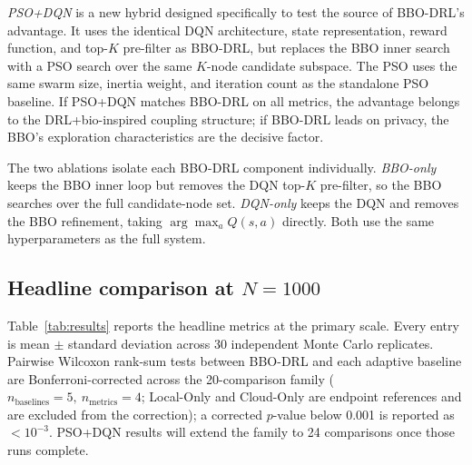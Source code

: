 \documentclass[journal]{IEEEtran}
\begin{document}
\textit{PSO+DQN} is a new hybrid designed specifically to test the
source of BBO-DRL's advantage. It uses the identical DQN architecture,
state representation, reward function, and top-$K$ pre-filter as
BBO-DRL, but replaces the BBO inner search with a PSO search over the
same $K$-node candidate subspace. The PSO uses the same swarm size,
inertia weight, and iteration count as the standalone PSO baseline.
If PSO+DQN matches BBO-DRL on all metrics, the advantage belongs to
the DRL+bio-inspired coupling structure; if BBO-DRL leads on privacy,
the BBO's exploration characteristics are the decisive factor.

The two ablations isolate each BBO-DRL component individually.
\textit{BBO-only} keeps the BBO inner loop but removes the DQN
top-$K$ pre-filter, so the BBO searches over the full candidate-node
set. \textit{DQN-only} keeps the DQN and removes the BBO refinement,
taking $\arg\max_a Q(s,a)$ directly. Both use the same hyperparameters
as the full system.

\subsection{Headline comparison at $N = 1000$}
\label{subsec:main}

Table~\ref{tab:results} reports the headline metrics at the primary
scale. Every entry is mean $\pm$ standard deviation across 30
independent Monte Carlo replicates. Pairwise Wilcoxon rank-sum tests
between BBO-DRL and each adaptive baseline are Bonferroni-corrected
across the 20-comparison family ($n_{\text{baselines}} = 5,\
n_{\text{metrics}} = 4$; Local-Only and Cloud-Only are endpoint
references and are excluded from the correction); a corrected
$p$-value below 0.001 is reported as $< 10^{-3}$. PSO+DQN results
will extend the family to 24 comparisons once those runs complete.
\end{document}
